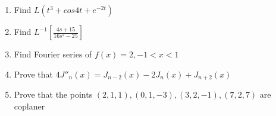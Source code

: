 \documentclass[17pt]{extarticle}
\begin{document}
\begin{enumerate}
    \item Find $ L(t^3 + cos 4t + e^{-2t} ) $
    \item Find $ L^{-1} \left[ \frac{4s+15}{16s^2-25} \right] $
    \item Find Fourier series of $ f(x) = 2, -1<x<1 $
    \item Prove that $ 4J''_n(x) =  J_{n-2}(x) - 2J_n(x) + J_{n+2}(x)  $
    \item Prove that the points $(2,1,1), (0,1,-3), (3,2,-1), (7,2,7)  $
    are coplaner
\end{enumerate}
\end{document}
